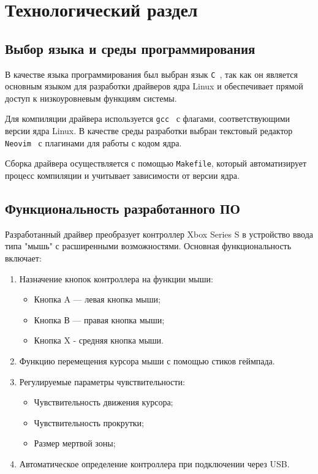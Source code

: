 \chapter{Технологический раздел}

\section{Выбор языка и среды программирования}

В качестве языка программирования был выбран язык \texttt{C}~\cite{cdocs}, так как он является основным языком для разработки драйверов ядра Linux и обеспечивает прямой доступ к низкоуровневым функциям системы.

Для компиляции драйвера используется \texttt{gcc}~\cite{gccdocs} с флагами, соответствующими версии ядра Linux. В качестве среды разработки выбран текстовый редактор \texttt{Neovim}~\cite{nvimdocs} с плагинами для работы с кодом ядра.

Сборка драйвера осуществляется с помощью \texttt{Makefile}, который автоматизирует процесс компиляции и учитывает зависимости от версии ядра.

\section{Функциональность разработанного ПО}

Разработанный драйвер преобразует контроллер Xbox Series S в устройство ввода типа "мышь" с расширенными возможностями. Основная функциональность включает:

\begin{enumerate}
	\item Назначение кнопок контроллера на функции мыши:
	\begin{itemize}[label=---]
		\item Кнопка A — левая кнопка мыши;
		\item Кнопка В — правая кнопка мыши;
		\item Кнопка X - средняя кнопка мыши.
	\end{itemize}
	\item Функцию перемещения курсора мыши с помощью стиков геймпада.
	\item Регулируемые параметры чувствительности:
	\begin{itemize}[label=---]
		\item Чувствительность движения курсора;
		\item Чувствительность прокрутки;
		\item Размер мертвой зоны;
	\end{itemize}
	\item Автоматическое определение контроллера при подключении через USB.
\end{enumerate}

